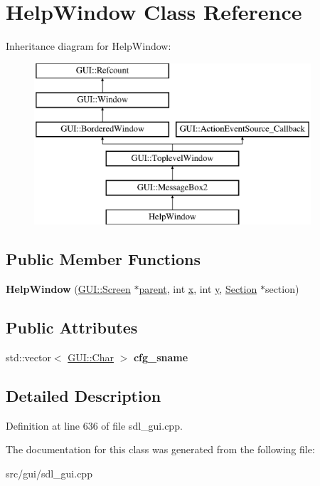 \hypertarget{classHelpWindow}{\section{Help\-Window Class Reference}
\label{classHelpWindow}
}
Inheritance diagram for Help\-Window\-:\begin{figure}[H]
\begin{center}
\leavevmode
\includegraphics[height=6.000000cm]{classHelpWindow}
\end{center}
\end{figure}
\subsection*{Public Member Functions}
\begin{DoxyCompactItemize}
\item 
\hypertarget{classHelpWindow_a187ef189ba63c6c5ecf56aea58890d91}{{\bfseries Help\-Window} (\hyperlink{classGUI_1_1Screen}{G\-U\-I\-::\-Screen} $\ast$\hyperlink{classGUI_1_1Window_a2e593ff65e7702178d82fe9010a0b539}{parent}, int \hyperlink{classGUI_1_1Window_a6ca6a80ca00c9e1d8ceea8d3d99a657d}{x}, int \hyperlink{classGUI_1_1Window_a0ee8e923aff2c3661fc2e17656d37adf}{y}, \hyperlink{classSection}{Section} $\ast$section)}\label{classHelpWindow_a187ef189ba63c6c5ecf56aea58890d91}

\end{DoxyCompactItemize}
\subsection*{Public Attributes}
\begin{DoxyCompactItemize}
\item 
\hypertarget{classHelpWindow_ab055ab815415faa5398c696f0947ae33}{std\-::vector$<$ \hyperlink{namespaceGUI_af6b04b46d40197b4f00e553d7d1a3e4c}{G\-U\-I\-::\-Char} $>$ {\bfseries cfg\-\_\-sname}}\label{classHelpWindow_ab055ab815415faa5398c696f0947ae33}

\end{DoxyCompactItemize}


\subsection{Detailed Description}


Definition at line 636 of file sdl\-\_\-gui.\-cpp.



The documentation for this class was generated from the following file\-:\begin{DoxyCompactItemize}
\item 
src/gui/sdl\-\_\-gui.\-cpp\end{DoxyCompactItemize}
